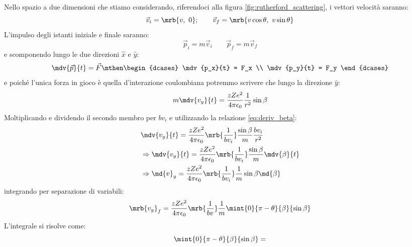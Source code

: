 \begin{itemize}
	      Nello spazio a due dimensioni che stiamo considerando, riferendoci alla
	      figura \ref{fig:rutherford_scattering}, i vettori velocità saranno:
	      \begin{equation}
		      \vec{v}_i = \mrb{v,\ 0};
		      \qquad
		      \vec{v}_f = \mrb{v\cos{\theta},\ v\sin{\theta}}
	      \end{equation}
	      L'impulso degli istanti iniziale e finale saranno:
	      \begin{equation}
		      \vec{p}_i = m\vec{v}_i \qquad \vec{p}_f = m\vec{v}_f
	      \end{equation}
	      e scomponendo lungo le due direzioni $\hat{x}$ e $\hat{y}$:
	      \begin{equation}
		      \mdv{\vec{p}}{t} = \vec{F} \mthen
		      \begin{dcases}
			      \mdv{p_x}{t} = F_x
			      \\
			      \mdv{p_y}{t} = F_y
		      \end{dcases}
	      \end{equation}
	      e poiché l'unica forza in gioco è quella d'interazione coulombiana
	      potremmo scrivere che lungo la direzione $\hat{y}$:
	      \begin{equation}
		      m\mdv{v_y}{t} = \frac{zZe^2}{4\pi\epsilon_0}\frac{1}{r^2}\sin{\beta}
	      \end{equation}
	      Moltiplicando e dividendo il secondo membro per $bv_i$ e utilizzando la
	      relazione \ref{eq:deriv_beta}:
	      \begin{align}
          &\mdv{v_y}{t} =
		      \frac{zZe^2}{4\pi\epsilon_0}\mrb{\frac{1}{bv_i}}
		      \frac{\sin{\beta}}{m}\frac{bv_i}{r^2}
		      \\\notag
		       & \Rightarrow \mdv{v_y}{t} =
		      \frac{zZe^2}{4\pi\epsilon_0}\mrb{\frac{1}{bv_i}}
		      \frac{\sin{\beta}}{m}\mdv{\beta}{t}
		      \\\notag
		       & \Rightarrow \md{v}_y =
		      \frac{zZe^2}{4\pi\epsilon_0}\mrb{\frac{1}{bv_i}}
		      \frac{1}{m}\sin{\beta} \md{\beta}
	      \end{align}
	      integrando per separazione di variabili:
	      \begin{equation}
		      \mrb{v_y}_f =
		      \frac{zZe^2}{4\pi\epsilon_0}\mrb{\frac{1}{bv}}
		      \frac{1}{m} \mint{0}{\pi-\theta}{\beta}{\sin{\beta}}
	      \end{equation}
	      L'integrale si risolve come:
	      \begin{equation}
		      \mint{0}{\pi-\theta}{\beta}{\sin{\beta}} =

\end{equation}
\end{itemize}
